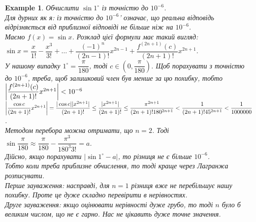 \documentclass[a4paper, 14pt]{article}
\theoremstyle{theoremdd}
\theoremstyle{theoremdd}
\theoremstyle{theoremdd}
\theoremstyle{theoremdd}
\newtheorem{example}[theorem]{Example}
\theoremstyle{theoremdd}
\theoremstyle{theoremdd}
\theoremstyle{theoremdd}
\theoremstyle{theoremdd}
\begin{document}
\begin{example}
Обчислити $\sin 1^\circ$ із точністю до $10^{-6}$.\\
Для дурних як я: із точністю до $10^{-6}$' означає, що реальна відповідь відрізняється від приблизної відповіді не більше ніж на $10^{-6}$.\\
Маємо $f(x) = \sin x$. Розклад цієї формули має такий вигляд:\\
$\sin x = \dfrac{x}{1!} - \dfrac{x^3}{3!} + \dots + \dfrac{(-1)^n}{(2n-1)!}x^{2n-1} + \dfrac{f^{(2n+1)}(c)}{(2n+1)!} x^{2n+1}$.\\
У нашому випадку $1^{\circ} = \dfrac{\pi}{180}$, тоді $c \in \left( 0, \dfrac{\pi}{180} \right)$.
Щоб порахувати з точністю до $10^{-6}$, треба, щоб залишковий член був менше за цю похибку, тобто\\
$\abs{\dfrac{f^{(2n+1)}(c)}{(2n+1)!} x^{2n+1}} < 10^{-6}$\\
$\abs{\dfrac{\cos c}{(2n+1)!} x^{2n+1}} = \dfrac{|\cos c| |x^{2n+1}|}{(2n+1)!} \leq \dfrac{|x^{2n+1}|}{(2n+1)!} \leq \dfrac{\pi^{2n+1}}{(2n+1)! 180^{2n+1}} < \dfrac{1}{(2n+1)! 45^{2n+1}} < \dfrac{1}{1000000}$.\\
Методом перебора можна отримати, що $n = 2$. Тоді\\
$\sin \dfrac{\pi}{180} \approx \dfrac{\pi}{180} - \dfrac{\pi^3}{180^3 3!} = a$.\\
Дійсно, якщо порахувати $|\sin 1^{\circ} - a|$, то різниця не є більше $10^{-6}$.\\
\textit{Тобто коли треба приблизне обчислення, то тоді краще через Лагранжа розписувати.}
\bigskip \\
Перше зауваження: насправді, для $n=1$ різниця вже не перебільшує нашу похибку. Проте це дуже складно перевірити в нерівностях.\\
Друге зауваження: якщо оцінювати нерівності дуже грубо, то тоді $n$ було б великим числом, що не є гарно. Нас не цікавить дуже точне значення.
\end{example}
\end{document}
